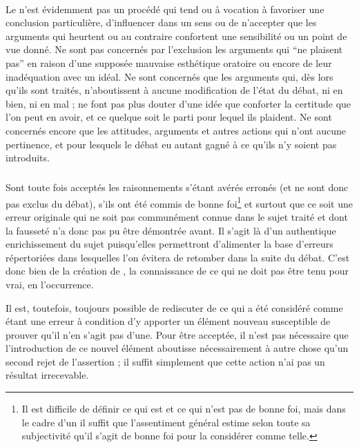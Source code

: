 \paragraph*{}
Le \mainabbr{} n’est évidemment pas un procédé qui tend ou à vocation à favoriser une conclusion particulière, d’influencer dans un sens ou de n’accepter que les arguments qui heurtent ou au contraire confortent une sensibilité ou un point de vue donné. Ne sont pas concernés par l’exclusion les arguments qui \enquote{ne plaisent pas} en raison d’une supposée mauvaise esthétique oratoire ou encore de leur inadéquation avec un idéal. Ne sont concernés que les arguments qui, dès lors qu’ils sont traités, n’aboutissent à aucune modification de l’état du débat, ni en bien, ni en mal ; ne font pas plus douter d’une idée que conforter la certitude que l’on peut en avoir, et ce quelque soit le parti pour lequel ils plaident. Ne sont concernés encore que les attitudes, arguments et autres actions qui n’ont aucune pertinence, et pour lesquels le débat eu {autant} gagné à ce qu’ils n’y soient pas introduits.

\subparagraph*{}
Sont toute fois acceptés les raisonnements s’étant avérés erronés (et ne sont donc pas exclus du débat), s’ils ont été commis de bonne foi\footnote{Il est difficile de définir ce qui est et ce qui n’est pas de bonne foi, mais dans le cadre d’un \mainabbr{} il suffit que l’assentiment général estime selon toute sa subjectivité qu’il s’agit de bonne foi pour la considérer comme telle.}
et surtout que ce soit une erreur originale qui ne soit pas communément connue dans le sujet traité et dont la fausseté n’a donc pas pu être démontrée avant. Il s’agit là d’un authentique enrichissement du sujet puisqu’elles permettront d’alimenter la base d’erreurs répertoriées dans lesquelles l’on évitera de retomber dans la suite du débat. C’est donc bien de la création de , la connaissance de ce qui ne doit pas être tenu pour vrai, en l’occurrence.

Il est, toutefois, toujours possible de rediscuter de ce qui a été considéré comme étant une erreur à condition d’y apporter un élément nouveau susceptible de prouver qu’il n’en s’agit pas d’une. Pour être acceptée, il n’est pas nécessaire que l’introduction de ce nouvel élément aboutisse nécessairement à autre chose qu’un second rejet de l’assertion ; il suffit simplement que cette action n’ai pas un résultat  irrecevable.

